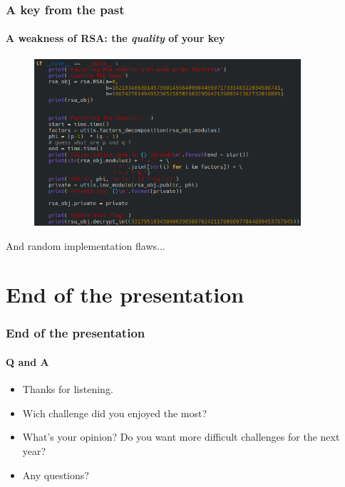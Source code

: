 \documentclass[]{beamer}
\begin{document}
\begin{frame}
\frametitle{A key from the past}
\framesubtitle{A weakness of RSA: the \textit{quality} of your key}
\begin{center}
\includegraphics[height=6.2cm, width=12.0cm]{./images/RSA-weak-prime-factors.png}
\end{center}
And random implementation flaws...
\end{frame}







%
%
\section*{End of the presentation}
\begin{frame}
    \frametitle{End of the presentation}
    \framesubtitle{Q and A}
    \begin{center}
        \begin{itemize}
            \item Thanks for listening.
            \item Wich challenge did you enjoyed the most?
            \item What's your opinion? Do you want more difficult challenges for the next year?
            \item Any questions?
        \end{itemize}
    \end{center}
\end{frame}
\end{document}
